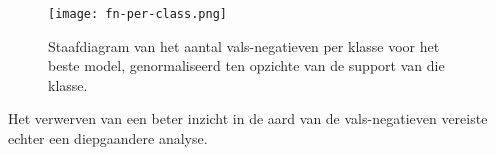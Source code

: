 \begin{figure}[H]
  \centering
  \texttt{[image: fn-per-class.png]}
  \caption[]{\label{fig:fn-per-class}
    Staafdiagram van het aantal vals-negatieven per klasse voor het beste model, genormaliseerd ten opzichte van de support van die klasse.
  }
\end{figure}

Het verwerven van een beter inzicht in de aard van de vals-negatieven vereiste echter een diepgaandere analyse.

